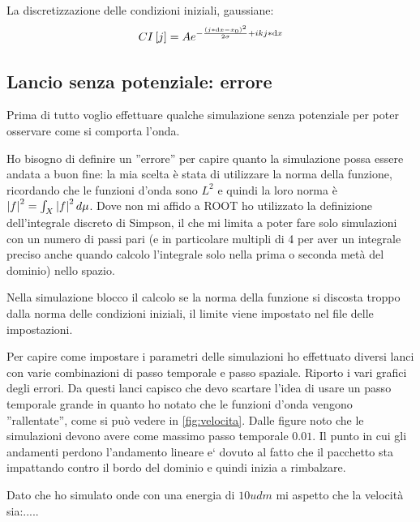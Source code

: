 La discretizzazione delle condizioni iniziali, gaussiane:
\begin{equation}
CI\lrq{j}= Ae^{-\frac{\lrt{j*\df x-x_0}^2}{2\sigma}+i k j*\df x}
\end{equation}

\subsection{Lancio senza potenziale: errore}\label{sec:errore}
Prima di tutto voglio effettuare qualche simulazione senza potenziale per poter osservare come si comporta l'onda.

Ho bisogno di definire un ''errore'' per capire quanto la simulazione possa essere andata a buon fine:
la mia scelta \`e stata di utilizzare la norma della funzione, ricordando che le funzioni d'onda sono $L^2$ e quindi la loro norma \`e  $\lr||f^2=\int_X\lr||f^2d\mu$.
Dove non mi affido a ROOT ho utilizzato la definizione dell'integrale discreto di Simpson, il che mi limita a poter fare solo simulazioni con un numero di passi pari (e in particolare multipli di 4 per aver un integrale preciso anche quando calcolo l'integrale solo nella prima o seconda met\`a del dominio) nello spazio.

Nella simulazione blocco il calcolo se la norma della funzione si discosta troppo dalla norma delle condizioni iniziali, il limite viene impostato nel file delle impostazioni.

Per capire come impostare i parametri delle simulazioni ho effettuato diversi lanci con varie combinazioni di passo temporale e passo spaziale. Riporto i vari grafici degli errori.
Da questi lanci capisco che devo scartare l'idea di usare un passo temporale grande in quanto ho notato che le funzioni d'onda vengono ''rallentate'', come si pu\`o vedere in \autoref{fig:velocita}. Dalle figure noto che le simulazioni devono avere come massimo passo temporale $0.01$. Il punto in cui gli andamenti perdono l'andamento lineare e` dovuto al fatto che il pacchetto sta impattando contro il bordo del dominio e quindi inizia a rimbalzare.

Dato che ho simulato onde con una energia di $10 udm$ mi aspetto che la velocit\`a sia:.....%

